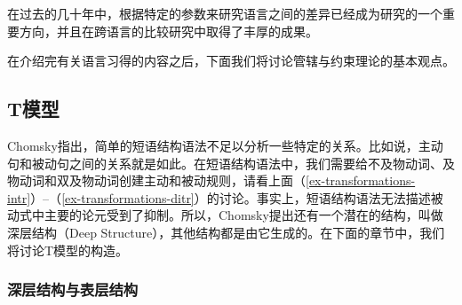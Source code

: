 在过去的几十年中，根据特定的参数来研究语言之间的差异已经成为研究的一个重要方向，并且在跨语言的比较研究中取得了丰厚的成果。

在介绍完有关语言习得的内容之后，下面我们将讨论管辖与约束理论的基本观点。

\subsection{T模型}
\label{Abschnitt-T-Modell}

Chomsky指出，简单的短语结构语法不足以分析一些特定的关系。比如说，主动句和被动句之间的关系就是如此。在短语结构语法中，我们需要给不及物动词、及物动词和双及物动词创建主动和被动规则，请看上面（\ref{ex-transformations-intr}）--（\ref{ex-transformations-ditr}）的讨论。事实上，短语结构语法无法描述被动式中主要的论元受到了抑制。所以，Chomsky提出还有一个潜在的结构，叫做深层结构（Deep Structure），其他结构都是由它生成的。在下面的章节中，我们将讨论T模型的构造。

\subsubsection{深层结构与表层结构}

